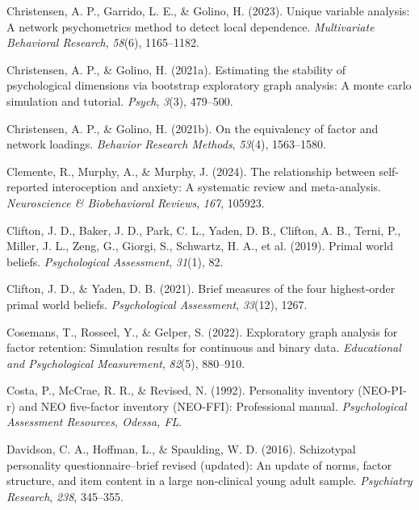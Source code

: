 \documentclass[
  jou,
  floatsintext,
  longtable,
  nolmodern,
  notxfonts,
  notimes,
  colorlinks=true,linkcolor=blue,citecolor=blue,urlcolor=blue]{apa7}
\newlength{\cslhangindent}
\newenvironment{CSLReferences}[2] %
 {\begin{list}{}{%
  \setlength{\itemindent}{0pt}
  \setlength{\leftmargin}{0pt}
  \setlength{\parsep}{0pt}
  \ifodd #1
   \setlength{\leftmargin}{\cslhangindent}
   \setlength{\itemindent}{-1\cslhangindent}
  \fi
  \setlength{\itemsep}{#2\baselineskip}}}
 {\end{list}}
\begin{document}
\begin{CSLReferences}{1}{0}
Christensen, A. P., Garrido, L. E., \& Golino, H. (2023). Unique
variable analysis: A network psychometrics method to detect local
dependence. \emph{Multivariate Behavioral Research}, \emph{58}(6),
1165--1182.

Christensen, A. P., \& Golino, H. (2021a). Estimating the stability of
psychological dimensions via bootstrap exploratory graph analysis: A
monte carlo simulation and tutorial. \emph{Psych}, \emph{3}(3),
479--500.

Christensen, A. P., \& Golino, H. (2021b). On the equivalency of factor
and network loadings. \emph{Behavior Research Methods}, \emph{53}(4),
1563--1580.

Clemente, R., Murphy, A., \& Murphy, J. (2024). The relationship between
self-reported interoception and anxiety: A systematic review and
meta-analysis. \emph{Neuroscience \& Biobehavioral Reviews}, \emph{167},
105923.

Clifton, J. D., Baker, J. D., Park, C. L., Yaden, D. B., Clifton, A. B.,
Terni, P., Miller, J. L., Zeng, G., Giorgi, S., Schwartz, H. A., et al.
(2019). Primal world beliefs. \emph{Psychological Assessment},
\emph{31}(1), 82.

Clifton, J. D., \& Yaden, D. B. (2021). Brief measures of the four
highest-order primal world beliefs. \emph{Psychological Assessment},
\emph{33}(12), 1267.

Cosemans, T., Rosseel, Y., \& Gelper, S. (2022). Exploratory graph
analysis for factor retention: Simulation results for continuous and
binary data. \emph{Educational and Psychological Measurement},
\emph{82}(5), 880--910.

Costa, P., McCrae, R. R., \& Revised, N. (1992). Personality inventory
(NEO-PI-r) and NEO five-factor inventory (NEO-FFI): Professional manual.
\emph{Psychological Assessment Resources, Odessa, FL}.

Davidson, C. A., Hoffman, L., \& Spaulding, W. D. (2016). Schizotypal
personality questionnaire--brief revised (updated): An update of norms,
factor structure, and item content in a large non-clinical young adult
sample. \emph{Psychiatry Research}, \emph{238}, 345--355.


\end{CSLReferences}
\end{document}
